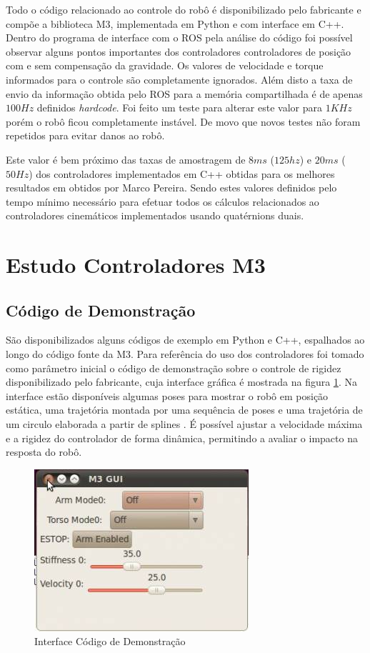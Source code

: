 Todo o código relacionado ao controle do robô é disponibilizado pelo fabricante e compõe a biblioteca M3, implementada em Python e com interface em C++. Dentro do programa de interface com o ROS pela análise do código foi possível observar alguns pontos importantes dos controladores controladores de posição com e sem compensação da gravidade. Os valores de velocidade e torque informados para o controle são completamente ignorados. Além disto a taxa de envio da informação obtida pelo ROS para a memória compartilhada é de apenas $100Hz$ definidos \textit{hardcode}. Foi feito um teste para alterar este valor para $1KHz$ porém o robô ficou completamente instável. De movo que novos testes não foram repetidos para evitar danos ao robô.

Este valor é bem próximo das taxas de amostragem de $8 ms$ ($125 hz$) e $20 ms$ ($50 Hz$) dos controladores implementados em C++ obtidas para os melhores resultados em \cite{marcosps2016} obtidos por Marco Pereira. Sendo estes valores definidos pelo tempo mínimo necessário para efetuar todos os cálculos relacionados ao controladores cinemáticos implementados usando quatérnions duais.

\section{Estudo Controladores M3}

\subsection{Código de Demonstração}

São disponibilizados alguns códigos de exemplo em Python e C++, espalhados ao longo do código fonte da M3. Para referência do uso dos controladores foi tomado como parâmetro inicial o código de demonstração sobre o controle de rigidez disponibilizado pelo fabricante, cuja interface gráfica é mostrada na figura \ref{fig:m3demo}. Na interface estão disponíveis algumas poses para mostrar o robô em posição estática, uma trajetória montada por uma sequência de poses e uma trajetória de um circulo elaborada a partir de splines \cite{nobody}. É possível ajustar a velocidade máxima e a rigidez do controlador de forma dinâmica, permitindo a avaliar o impacto na resposta do robô.

\begin{figure}[H]
    \centering
    \includegraphics[width=0.5\linewidth]{tex/figs/mekademo.png}
    \caption{Interface Código de Demonstração \cite{mekaguide}}
    \label{fig:m3demo}
\end{figure}

